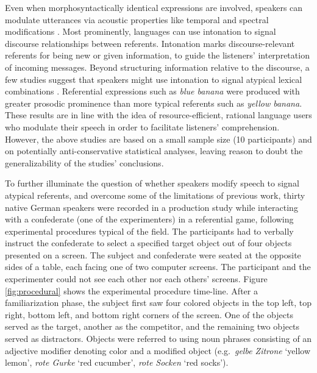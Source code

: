 \documentclass[Review,times,sageh]{sagej}
\begin{document}
Even when morphosyntactically identical expressions are involved, speakers can modulate utterances via acoustic properties like temporal and spectral modifications \citep[e.g.,][]{ladd2008intonational}.
Most prominently, languages can use intonation to signal discourse relationships between referents.
Intonation marks discourse-relevant referents for being new or given information, to guide the listeners' interpretation of incoming messages.
Beyond structuring information relative to the discourse, a few studies suggest that speakers might use intonation to signal atypical lexical combinations \citep[e.g.][]{dimitrova2008prosodic, dimitrova2009did}.
Referential expressions such as \emph{blue banana} were produced with greater prosodic prominence than more typical referents such as \emph{yellow banana}.
These results are in line with the idea of resource-efficient, rational language users who modulate their speech in order to facilitate listeners' comprehension.
However, the above studies are based on a small sample size (10 participants) and on potentially anti-conservative statistical analyses, leaving reason to doubt the generalizability of the studies' conclusions.

To further illuminate the question of whether speakers modify speech to signal atypical referents, and overcome some of the limitations of previous work, thirty native German speakers were recorded in a production study while interacting with a confederate (one of the experimenters) in a referential game, following experimental procedures typical of the field.
The participants had to verbally instruct the confederate to select a specified target object out of four objects presented on a screen.
The subject and confederate were seated at the opposite sides of a table, each facing one of two computer screens.
The participant and the experimenter could not see each other nor each others' screens.
Figure \ref{fig:procedural} shows the experimental procedure time-line.
After a familiarization phase, the subject first saw four colored objects in the top left, top right, bottom left, and bottom right corners of the screen.
One of the objects served as the target, another as the competitor, and the remaining two objects served as distractors.
Objects were referred to using noun phrases consisting of an adjective modifier denoting color and a modified object (e.g.~\emph{gelbe Zitrone} `yellow lemon', \emph{rote Gurke} `red cucumber', \emph{rote Socken} `red socks').
\end{document}
